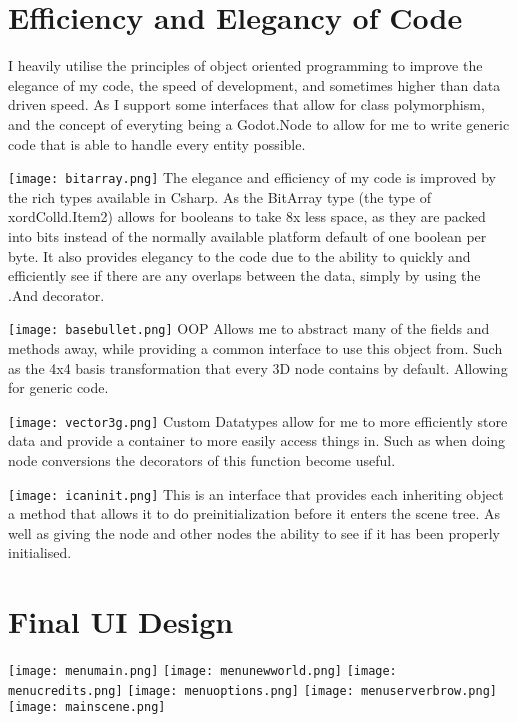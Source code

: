 \documentclass[12pt, DIV=calc]{scrartcl}
\begin{document}
\clearpage
\section{Efficiency and Elegancy of Code}
I heavily utilise the principles of object oriented programming to improve the elegance of my code, the speed of development, and sometimes higher than data driven speed. As I support some interfaces that allow for class polymorphism, and the concept of everyting being a Godot.Node to allow for me to write generic code that is able to handle every entity possible. 

\texttt{[image: bitarray.png]}
The elegance and efficiency of my code is improved by the rich types available in Csharp. As the BitArray type (the type of xordColld.Item2) allows for booleans to take 8x less space, as they are packed into bits instead of the normally available platform default of one boolean per byte. It also provides elegancy to the code due to the ability to quickly and efficiently see if there are any overlaps between the data, simply by using the .And decorator.

\texttt{[image: basebullet.png]}
OOP Allows me to abstract many of the fields and methods away, while providing a common interface to use this object from. Such as the 4x4 basis transformation that every 3D node contains by default. Allowing for generic code.

\texttt{[image: vector3g.png]}
Custom Datatypes allow for me to more efficiently store data and provide a container to more easily access things in. Such as when doing node conversions the decorators of this function become useful.


\texttt{[image: icaninit.png]}
This is an interface that provides each inheriting object a method that allows it to do preinitialization before it enters the scene tree. As well as giving the node and other nodes the ability to see if it has been properly initialised. 




\clearpage
\section{Final UI Design}
\texttt{[image: menumain.png]}
\texttt{[image: menunewworld.png]}
\texttt{[image: menucredits.png]}
\texttt{[image: menuoptions.png]}
\texttt{[image: menuserverbrow.png]}
\texttt{[image: mainscene.png]}
\end{document}
